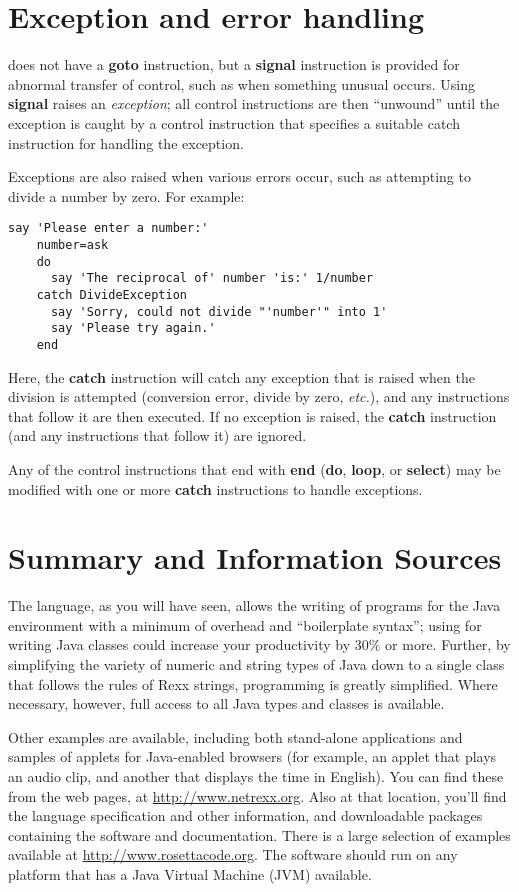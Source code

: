 \section{Exception and error handling}\label{exceptions}
\nr{} does not have a \textbf{goto} instruction, but a \textbf{signal} instruction is provided for abnormal transfer of control, such as when something unusual occurs. Using \textbf{signal} raises an \emph{exception}; all control instructions are then “unwound” until the exception is caught by a control instruction that specifies a suitable catch instruction for handling the exception.

Exceptions are also raised when various errors occur, such as
attempting to divide a number by zero. For example:
\begin{lstlisting}[label=exception,caption=Exception]
    say 'Please enter a number:'
    number=ask
    do
      say 'The reciprocal of' number 'is:' 1/number
    catch DivideException
      say 'Sorry, could not divide "'number'" into 1'
      say 'Please try again.'
    end
\end{lstlisting}
Here, the \textbf{catch} instruction will catch any exception that is raised when the division is attempted (conversion error, divide by zero, \emph{etc.}), and any instructions that follow it are then executed. If no exception is raised, the \textbf{catch} instruction (and any instructions that follow it) are ignored.

Any of the control instructions that end with \textbf{end} (\textbf{do}, \textbf{loop}, or \textbf{select}) may be modified with one or more \textbf{catch} instructions to handle exceptions.

\section{Summary and Information Sources}
The \nr{} language, as you will have seen, allows the writing of programs for the Java environment with a minimum of overhead and “boilerplate syntax”; using \nr{} for writing Java classes could increase your productivity by 30\% or more.
Further, by simplifying the variety of numeric and string types of
Java down to a single class that follows the rules of Rexx strings,
programming is greatly simplified. Where necessary, however, full
access to all Java types and classes is available.

Other examples are available, including both stand-alone applications and samples of applets for Java-enabled browsers (for example, an applet that plays an audio clip, and another that displays the time in English). You can find these from the \nr{} web pages, at
    \url{http://www.netrexx.org}.
Also at that location, you’ll find the \nr{} language specification
and other information, and downloadable packages containing the
\nr{} software and documentation. There is a large selection of
\nr{} examples available at \url{http://www.rosettacode.org}.
The software should run on any platform that has a Java Virtual
Machine (JVM) available.
